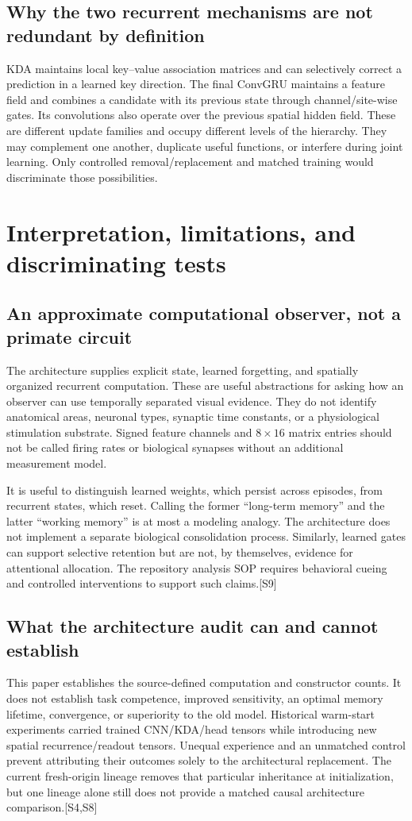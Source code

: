 \documentclass[10pt,letterpaper]{article}
\newcommand{\src}[1]{\textcolor{accent}{\textsf{[#1]}}}
\newcommand{\psection}[1]{\clearpage\section{#1}}
\begin{document}
\subsection{Why the two recurrent mechanisms are not redundant by definition}
KDA maintains local key--value association matrices and can selectively correct a prediction in a learned key direction. The final ConvGRU maintains a feature field and combines a candidate with its previous state through channel/site-wise gates. Its convolutions also operate over the previous spatial hidden field. These are different update families and occupy different levels of the hierarchy. They may complement one another, duplicate useful functions, or interfere during joint learning. Only controlled removal/replacement and matched training would discriminate those possibilities.

\psection{Interpretation, limitations, and discriminating tests}
\subsection{An approximate computational observer, not a primate circuit}
The architecture supplies explicit state, learned forgetting, and spatially organized recurrent computation. These are useful abstractions for asking how an observer can use temporally separated visual evidence. They do not identify anatomical areas, neuronal types, synaptic time constants, or a physiological stimulation substrate. Signed feature channels and $8\times16$ matrix entries should not be called firing rates or biological synapses without an additional measurement model.

It is useful to distinguish learned weights, which persist across episodes, from recurrent states, which reset. Calling the former ``long-term memory'' and the latter ``working memory'' is at most a modeling analogy. The architecture does not implement a separate biological consolidation process. Similarly, learned gates can support selective retention but are not, by themselves, evidence for attentional allocation. The repository analysis SOP requires behavioral cueing and controlled interventions to support such claims.\src{S9}

\subsection{What the architecture audit can and cannot establish}
This paper establishes the source-defined computation and constructor counts. It does not establish task competence, improved sensitivity, an optimal memory lifetime, convergence, or superiority to the old model. Historical warm-start experiments carried trained CNN/KDA/head tensors while introducing new spatial recurrence/readout tensors. Unequal experience and an unmatched control prevent attributing their outcomes solely to the architectural replacement. The current fresh-origin lineage removes that particular inheritance at initialization, but one lineage alone still does not provide a matched causal architecture comparison.\src{S4,S8}
\end{document}
